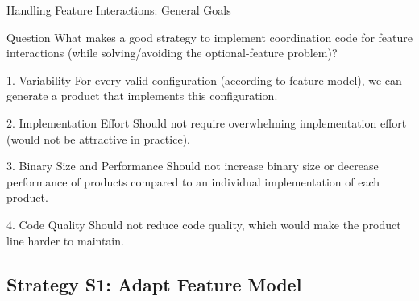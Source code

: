 \begin{frame}{Handling Feature Interactions: General Goals}
	\begin{note}{Question}
		What makes a good strategy to implement coordination code for feature interactions (while solving/avoiding the optional-feature problem)?
	\end{note}
	\pause
	\begin{fancycolumns}[animation=none]
		\begin{definition}{1. Variability}
			For every valid configuration (according to feature model), we can generate a product that implements this configuration.
		\end{definition}
		\pause
		\begin{definition}{2. Implementation Effort}
			Should not require overwhelming implementation effort (would not be attractive in practice).
		\end{definition}
		\pause
	\nextcolumn
		\begin{definition}{3. Binary Size and Performance}
			Should not increase binary size or decrease performance of products compared to an individual implementation of each product.
		\end{definition}
		\pause
		\begin{definition}{4. Code Quality}
			Should not reduce code quality, which would make the product line harder to maintain. 
		\end{definition}
	\end{fancycolumns}
\end{frame}


\subsection{Strategy S1: Adapt Feature Model}

